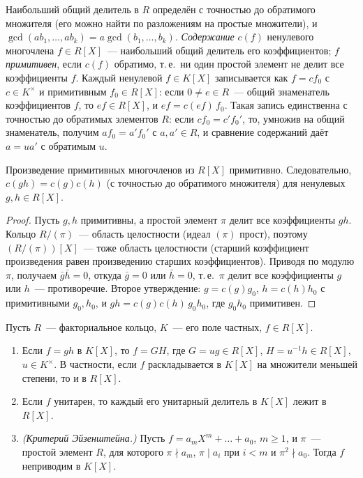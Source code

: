Наибольший общий делитель в $R$ определён с точностью до обратимого множителя (его можно найти по разложениям на простые
множители), и $\gcd(ab_1,\dots,ab_k)=a\gcd(b_1,\dots,b_k)$. \emph{Содержание} $c(f)$ ненулевого многочлена $f\in R[X]$~---
наибольший общий делитель его коэффициентов; $f$ \emph{примитивен}, если $c(f)$ обратимо, т.\,е.\ ни один простой элемент
не делит все коэффициенты $f$. Каждый ненулевой $f\in K[X]$ записывается как $f=cf_0$ с $c\in K^\times$ и примитивным
$f_0\in R[X]$: если $0\ne e\in R$~--- общий знаменатель коэффициентов $f$, то $ef\in R[X]$, и $ef=c(ef)\,f_0$. Такая запись
единственна с точностью до обратимых элементов $R$: если $cf_0=c'f_0'$, то, умножив на общий знаменатель, получим
$af_0=a'f_0'$ с $a,a'\in R$, и сравнение содержаний даёт $a=ua'$ с обратимым $u$.

\begin{lemma}
Произведение примитивных многочленов из $R[X]$ примитивно. Следовательно, $c(gh)=c(g)c(h)$ (с точностью до обратимого
множителя) для ненулевых $g,h\in R[X]$.
\end{lemma}

\begin{proof}
Пусть $g,h$ примитивны, а простой элемент $\pi$ делит все коэффициенты $gh$. Кольцо $R/(\pi)$~--- область целостности
(идеал $(\pi)$ прост), поэтому $(R/(\pi))[X]$~--- тоже область целостности (старший коэффициент произведения равен
произведению старших коэффициентов). Приводя по модулю $\pi$, получаем $\bar g\bar h=0$, откуда $\bar g=0$ или $\bar h=0$,
т.\,е.\ $\pi$ делит все коэффициенты $g$ или $h$~--- противоречие. Второе утверждение: $g=c(g)g_0$, $h=c(h)h_0$ с
примитивными $g_0,h_0$, и $gh=c(g)c(h)\,g_0h_0$, где $g_0h_0$ примитивен.
\end{proof}

\begin{theorem}[1.16c]
Пусть $R$~--- факториальное кольцо, $K$~--- его поле частных, $f\in R[X]$.
\begin{enumerate}[label=(\alph*)]
\item Если $f=gh$ в $K[X]$, то $f=GH$, где $G=ug\in R[X]$, $H=u^{-1}h\in R[X]$, $u\in K^\times$. В частности, если $f$
раскладывается в $K[X]$ на множители меньшей степени, то и в $R[X]$.
\item Если $f$ унитарен, то каждый его унитарный делитель в $K[X]$ лежит в $R[X]$.
\item \emph{(Критерий Эйзенштейна.)} Пусть $f=a_mX^m+\dots+a_0$, $m\ge1$, и $\pi$~--- простой элемент $R$, для которого
$\pi\nmid a_m$, $\pi\mid a_i$ при $i<m$ и $\pi^2\nmid a_0$. Тогда $f$ неприводим в $K[X]$.
\end{enumerate}
\end{theorem}


